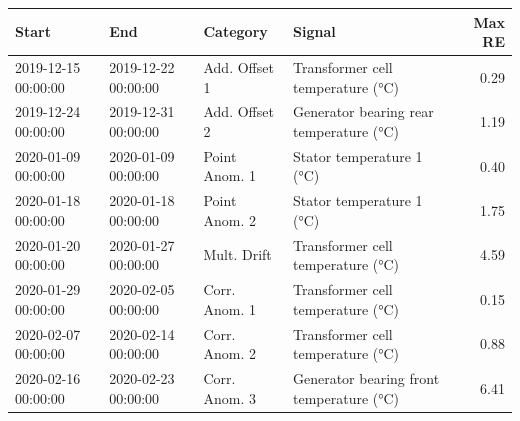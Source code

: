 \begin{tabular}{llllr}
\toprule
Start & End & Category & Signal & Max RE \\
\midrule
2019-12-15 00:00:00 & 2019-12-22 00:00:00 & Add. Offset 1 & Transformer cell temperature (°C) & 0.29 \\
2019-12-24 00:00:00 & 2019-12-31 00:00:00 & Add. Offset 2 & Generator bearing rear temperature (°C) & 1.19 \\
2020-01-09 00:00:00 & 2020-01-09 00:00:00 & Point Anom. 1 & Stator temperature 1 (°C) & 0.40 \\
2020-01-18 00:00:00 & 2020-01-18 00:00:00 & Point Anom. 2 & Stator temperature 1 (°C) & 1.75 \\
2020-01-20 00:00:00 & 2020-01-27 00:00:00 & Mult. Drift & Transformer cell temperature (°C) & 4.59 \\
2020-01-29 00:00:00 & 2020-02-05 00:00:00 & Corr. Anom. 1 & Transformer cell temperature (°C) & 0.15 \\
2020-02-07 00:00:00 & 2020-02-14 00:00:00 & Corr. Anom. 2 & Transformer cell temperature (°C) & 0.88 \\
2020-02-16 00:00:00 & 2020-02-23 00:00:00 & Corr. Anom. 3 & Generator bearing front temperature (°C) & 6.41 \\
\bottomrule
\end{tabular}
